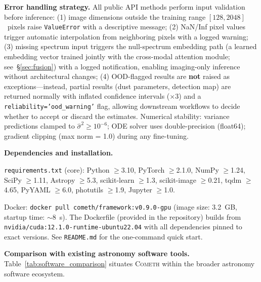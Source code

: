 \documentclass[usenatbib]{mnras}
\begin{document}
\textbf{Error handling strategy.} All public API methods perform input validation before inference: (1) image dimensions outside the training range $[128, 2048]$~pixels raise {\tt ValueError} with a descriptive message; (2) NaN/Inf pixel values trigger automatic interpolation from neighboring pixels with a logged warning; (3) missing spectrum input triggers the null-spectrum embedding path (a learned embedding vector trained jointly with the cross-modal attention module; see~\S\ref{sec:fusion}) with a logged notification, enabling imaging-only inference without architectural changes; (4) OOD-flagged results are \textbf{not} raised as exceptions---instead, partial results (dust parameters, detection map) are returned normally with inflated confidence intervals ($\times 3$) and a {\tt reliability='ood\_warning'} flag, allowing downstream workflows to decide whether to accept or discard the estimates. Numerical stability: variance predictions clamped to $\hat{\sigma}^2 \geq 10^{-6}$; ODE solver uses double-precision (float64); gradient clipping (max norm = 1.0) during any fine-tuning.

\textbf{Dependencies and installation.}

{\tt requirements.txt} (core): Python $\geq$3.10, PyTorch $\geq$2.1.0, NumPy $\geq$1.24, SciPy $\geq$1.11, Astropy $\geq$5.3, scikit-learn $\geq$1.3, scikit-image $\geq$0.21, tqdm $\geq$4.65, PyYAML $\geq$6.0, photutils $\geq$1.9, Jupyter $\geq$1.0.

Docker: {\tt docker pull cometh/framework:v0.9.0-gpu} (image size: 3.2~GB, startup time: $\sim$8~s). The Dockerfile (provided in the repository) builds from {\tt nvidia/cuda:12.1.0-runtime-ubuntu22.04} with all dependencies pinned to exact versions. See {\tt README.md} for the one-command quick start.

\textbf{Comparison with existing astronomy software tools.} Table~\ref{tab:software_comparison} situates \textsc{Cometh} within the broader astronomy software ecosystem.
\end{document}
